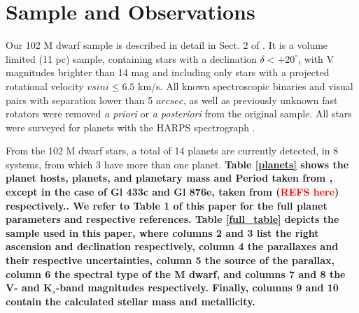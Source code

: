 \documentclass[structabstract]{aa}
\begin{document}






%












\section{Sample and Observations}
\label{sample}

Our 102 M dwarf sample is described in detail in Sect. 2 of \citet{Bonfils-2011}. It is a volume limited (11 pc) sample, containing stars with a declination $\delta< +20^{\circ}$, with V magnitudes brighter than 14  mag and including only stars with a projected rotational velocity $vsini\le 6.5$ km/s. All known spectroscopic binaries and visual pairs with separation lower than 5 $arcsec$, as well as previously unknown fast rotators were removed \textit{a priori} or \textit{a posteriori} from the original sample. All stars were surveyed for planets with the HARPS spectrograph \citep{Mayor-2003b}.


From the 102 M dwarf stars, a total of 14 planets are currently detected, in 8 systems, from which 3 have more than one planet.\textbf{ Table \ref{planets} shows the planet hosts, planets, and planetary mass and Period taken from \citet{Bonfils-2011}, except in the case of Gl 433c and Gl 876e, taken from (\textcolor{red}{REFS here}) respectively.. We refer to Table 1 of this paper for the full planet parameters and respective references. Table \ref{full_table} depicts the sample used in this paper, where columns 2 and 3 list the right ascension and declination respectively, column 4 the parallaxes and their respective uncertainties, column 5 the source of the parallax, column 6 the spectral type of the M dwarf, and columns 7 and 8 the V- and K$_{s}$-band magnitudes respectively. Finally, columns 9 and 10 contain the calculated stellar mass and metallicity.}
\end{document}
